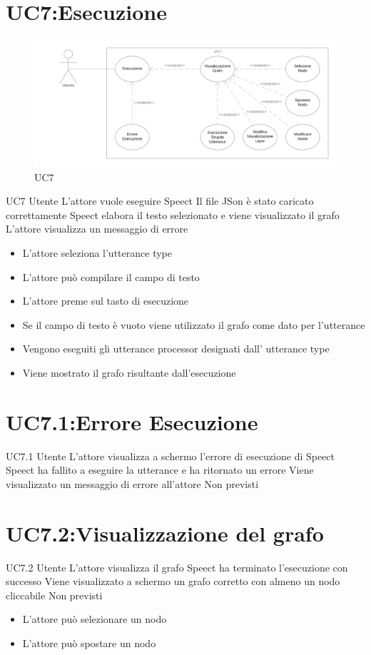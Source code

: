 \documentclass[../AnalisideiRequisiti.tex]{subfiles}
\begin{document}
\section{UC7:Esecuzione}
\begin{figure}[H]
	\caption{UC7}
	\centering
	\includegraphics[width=\textwidth]{../img/UC07.png}
\end{figure}
\UserCase
{UC7}
{Utente}
{}
{L'attore vuole eseguire Speect}
{Il file JSon è stato caricato correttamente}
{Speect elabora il testo selezionato e viene visualizzato il grafo}
{L'attore visualizza un messaggio di errore }
{\begin{itemize}
		\item{} L'attore seleziona l'utterance type
		\item{} L'attore può compilare il campo di testo
		\item{} L'attore preme sul tasto di esecuzione
		\item{} Se il campo di testo è vuoto viene utilizzato il grafo come dato per l'utterance
		\item{} Vengono eseguiti gli utterance processor designati dall' utterance type
		\item{} Viene mostrato il grafo risultante dall'esecuzione 
	\end{itemize}
}

\section{UC7.1:Errore Esecuzione}
\UserCase
{UC7.1}
{Utente}
{}
{L'attore visualizza a schermo l'errore di esecuzione di Speect }
{Speect ha fallito a eseguire la utterance e ha ritornato un errore}
{Viene visualizzato un messaggio di errore all'attore}
{Non previsti}
{}
\section{UC7.2:Visualizzazione del grafo}
\UserCase
{UC7.2}
{Utente}
{}
{L'attore visualizza il grafo}
{Speect ha terminato l'esecuzione con successo}
{Viene visualizzato a schermo un grafo corretto con almeno un nodo cliccabile}
{Non previsti}
{
	\begin{itemize}
		\item{} L'attore può selezionare un nodo 
		\item{} L'attore può spostare un nodo 
	\end{itemize}
}
\end{document}
